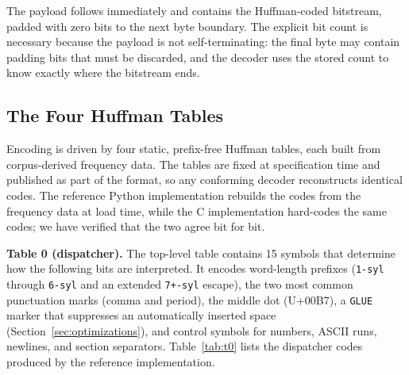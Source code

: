 \documentclass[conference]{IEEEtran}
\begin{document}
The payload follows immediately and contains the Huffman-coded bitstream,
padded with zero bits to the next byte boundary. The explicit bit count is
necessary because the payload is not self-terminating: the final byte may
contain padding bits that must be discarded, and the decoder uses the stored
count to know exactly where the bitstream ends.

\subsection{The Four Huffman Tables}

Encoding is driven by four static, prefix-free Huffman tables, each built
from corpus-derived frequency data. The tables are fixed at specification
time and published as part of the format, so any conforming decoder
reconstructs identical codes. The reference Python implementation rebuilds
the codes from the frequency data at load time, while the C implementation
hard-codes the same codes; we have verified that the two agree bit for bit.

\textbf{Table 0 (dispatcher).} The top-level table contains 15 symbols that
determine how the following bits are interpreted. It encodes word-length
prefixes (\texttt{1-syl} through \texttt{6-syl} and an extended
\texttt{7+-syl} escape), the two most common punctuation marks (comma and
period), the middle dot (U+00B7), a \texttt{GLUE} marker that suppresses an
automatically inserted space (Section~\ref{sec:optimizations}), and control
symbols for numbers, ASCII runs, newlines, and section separators.
Table~\ref{tab:t0} lists the dispatcher codes produced by the reference
implementation.
\end{document}
